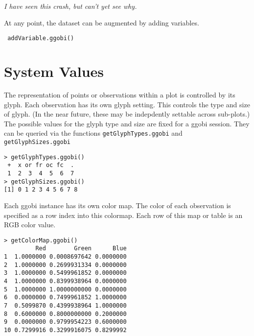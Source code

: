 \documentclass{article}
\def\SFunction#1{{\texttt{\red #1}}}
\def\note#1{\textsl{\red #1}}
\begin{document}
\note{I have seen this crash, but can't yet see why.}


At any point, the dataset can be augmented by adding variables.
\begin{verbatim}
 addVariable.ggobi()
\end{verbatim}



\section{System Values}
The representation of points or observations within a plot is
controlled by its glyph.  Each observation has its own glyph
setting. This controls the type  and size of glyph.
(In the near future, these may be indepdently settable across
sub-plots.)
The possible values for the glyph type and size
are fixed for a ggobi session.
They can be queried via the functions
\SFunction{getGlyphTypes.ggobi}
and 
\SFunction{getGlyphSizes.ggobi}

\begin{verbatim}
> getGlyphTypes.ggobi()
 +  x or fr oc fc  . 
 1  2  3  4  5  6  7 
> getGlyphSizes.ggobi()
[1] 0 1 2 3 4 5 6 7 8
\end{verbatim}

Each ggobi instance has its own color map.  The color of each
observation is specified as a row index into this colormap.  Each row
of this map or table is an RGB color value.

\begin{verbatim}
> getColorMap.ggobi()
         Red        Green      Blue
1  1.0000000 0.0008697642 0.0000000
2  1.0000000 0.2699931334 0.0000000
3  1.0000000 0.5499961852 0.0000000
4  1.0000000 0.8399938964 0.0000000
5  1.0000000 1.0000000000 0.0000000
6  0.0000000 0.7499961852 1.0000000
7  0.5099870 0.4399938964 1.0000000
8  0.6000000 0.8000000000 0.2000000
9  0.0000000 0.9799954223 0.6000000
10 0.7299916 0.3299916075 0.8299992
\end{verbatim}
\end{document}
